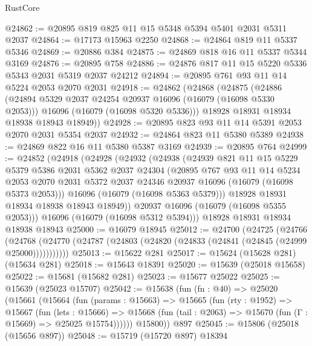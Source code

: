 \begin{lexlean}{RustCore}
\begin{coremodule}
@24862 := @20895 @819 @825 @11 @15 @5348 @5394 @5401 @2031 @5311 @2037
@24864 := @17173 @15963 @2250
@24868 := @24864 @819 @11 @5337 @5346
@24869 := @20886 @384
@24875 := @24869 @818 @16 @11 @5337 @5344 @3169
@24876 := @20895 @758
@24886 := @24876 @817 @11 @15 @5220 @5336 @5343 @2031 @5319 @2037 @24212
@24894 := @20895 @761 @93 @11 @14 @5224 @2053 @2070 @2031
@24918 := @24862
    (@24868
      (@24875
        (@24886
          (@24894 @5329 @2037 @24254 @20937 @16096 (@16079 (@16098 @5330 @2053)))
          @16096
          (@16079 (@16098 @5320 @5336)))
        @18928
        @18931
        @18934
        @18938
        @18943
        @18949))
@24928 := @20895 @823 @93 @11 @14 @5391 @2053 @2070 @2031 @5354 @2037
@24932 := @24864 @823 @11 @5380 @5389
@24938 := @24869 @822 @16 @11 @5380 @5387 @3169
@24939 := @20895 @764
@24999 := @24852
    (@24918
      (@24928
        (@24932
          (@24938
            (@24939
              @821
              @11
              @15
              @5229
              @5379
              @5386
              @2031
              @5362
              @2037
              @24304
              (@20895
                @767
                @93
                @11
                @14
                @5234
                @2053
                @2070
                @2031
                @5372
                @2037
                @24346
                @20937
                @16096
                (@16079 (@16098 @5373 @2053)))
              @16096
              (@16079 (@16098 @5363 @5379)))
            @18928
            @18931
            @18934
            @18938
            @18943
            @18949))
        @20937
        @16096
        (@16079 (@16098 @5355 @2053)))
      @16096
      (@16079 (@16098 @5312 @5394)))
    @18928
    @18931
    @18934
    @18938
    @18943
@25000 := @16079 @18945
@25012 := @24700
    (@24725
      (@24766
        (@24768 (@24770 (@24787 (@24803 (@24820 (@24833 (@24841 (@24845 (@24999 @25000)))))))))))
@25013 := @15622 @281
@25017 := @15624 (@15628 @281) (@15634 @281)
@25018 := @15643 @18391
@25020 := @15639 (@25018 @15658)
@25022 := @15681 (@15682 @281)
@25023 := @15677 @25022
@25025 := @15639 (@25023 @15707)
@25042 := @15638
    (fun (fn : @40) =>
    @25020
      (@15661
        (@15664
          (fun (params : @15663) =>
          @15665
            (fun (rty : @1952) =>
            @15667
              (fun (lets : @15666) =>
              @15668 (fun (tail : @2063) => @15670 (fun (Γ : @15669) => @25025 @15754))))))
        @15800))
    @897
@25045 := @15806 (@25018 (@15656 @897))
@25048 := @15719 (@15720 @897) @18394

\end{coremodule}
\end{lexlean}
